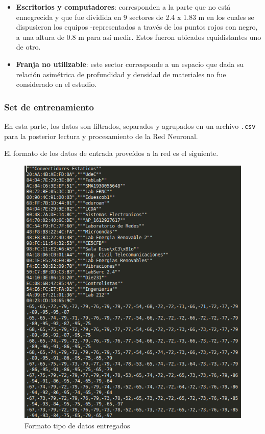 \begin{itemize}
    \item {\textbf{Escritorios y computadores}: corresponden a la parte que no está ennegrecida y que fue dividida en 9 sectores de 2.4 x 1.83 m en los cuales se dispusieron los equipos -representados a través de los puntos rojos con negro, a una altura de 0.8 m para así medir. Estos fueron ubicados equidistantes uno de otro.}
    \item{\textbf{Franja no utilizable}: este sector corresponde a un espacio que dada su relación asimétrica de profundidad y densidad de materiales no fue considerado en el estudio.}
\end{itemize}

\subsubsection{Set de entrenamiento}
En esta parte, los datos son filtrados, separados y agrupados en un archivo \texttt{.csv} para la posterior lectura y procesamiento de la Red Neuronal.

El formato de los datos de entrada proveídos a la red es el siguiente.
\begin{figure}[h!]
    \centering
    \includegraphics[scale=0.5]{./images/plaincsv}
    \caption{Formato tipo de datos entregados }
    \label{fig:datos}
\end{figure}


